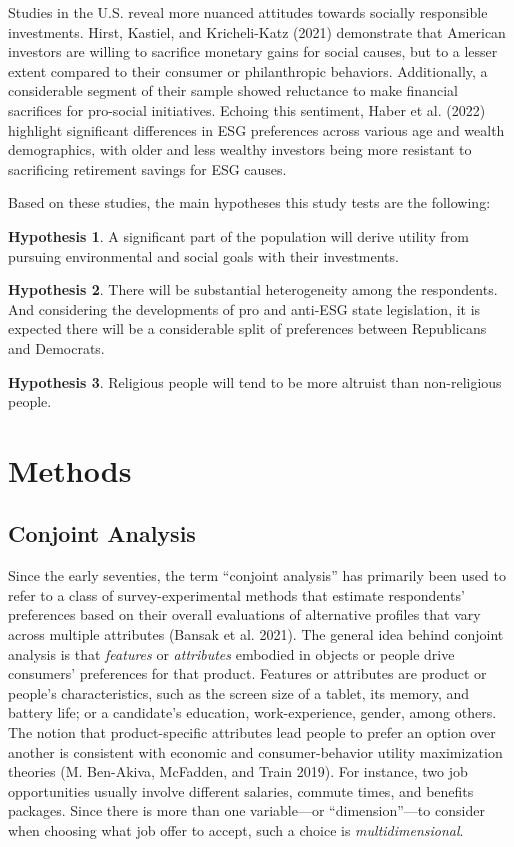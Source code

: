 \documentclass[
  12pt,
]{article}
\begin{document}
Studies in the U.S. reveal more nuanced attitudes towards socially responsible investments. Hirst, Kastiel, and Kricheli-Katz (2021) demonstrate that American investors are willing to sacrifice monetary gains for social causes, but to a lesser extent compared to their consumer or philanthropic behaviors. Additionally, a considerable segment of their sample showed reluctance to make financial sacrifices for pro-social initiatives. Echoing this sentiment, Haber et al. (2022) highlight significant differences in ESG preferences across various age and wealth demographics, with older and less wealthy investors being more resistant to sacrificing retirement savings for ESG causes.

Based on these studies, the main hypotheses this study tests are the following:

\textbf{Hypothesis 1}. A significant part of the population will derive utility from pursuing environmental and social goals with their investments.

\textbf{Hypothesis 2}. There will be substantial heterogeneity among the respondents. And considering the developments of pro and anti-ESG state legislation, it is expected there will be a considerable split of preferences between Republicans and Democrats.

\textbf{Hypothesis 3}. Religious people will tend to be more altruist than non-religious people.

\hypertarget{methods}{%
\section{Methods}\label{methods}}

\hypertarget{conjoint-analysis}{%
\subsection{Conjoint Analysis}\label{conjoint-analysis}}

Since the early seventies, the term ``conjoint analysis'' has primarily been used to refer to a class of survey-experimental methods that estimate respondents' preferences based on their overall evaluations of alternative profiles that vary across multiple attributes (Bansak et al. 2021). The general idea behind conjoint analysis is that \emph{features} or \emph{attributes} embodied in objects or people drive consumers' preferences for that product. Features or attributes are product or people's characteristics, such as the screen size of a tablet, its memory, and battery life; or a candidate's education, work-experience, gender, among others. The notion that product-specific attributes lead people to prefer an option over another is consistent with economic and consumer-behavior utility maximization theories (M. Ben-Akiva, McFadden, and Train 2019). For instance, two job opportunities usually involve different salaries, commute times, and benefits packages. Since there is more than one variable---or ``dimension''---to consider when choosing what job offer to accept, such a choice is \emph{multidimensional}.
\end{document}
